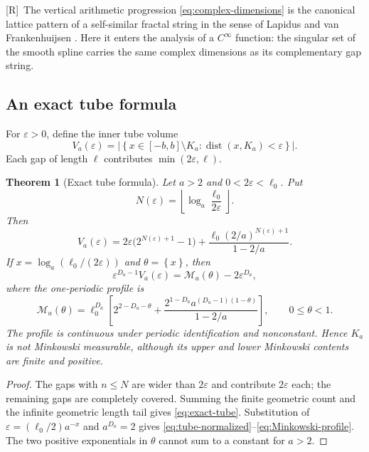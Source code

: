 \documentclass[11pt,oneside]{article}
\newtheorem{theorem}{Theorem}[section]
\theoremstyle{definition}
\theoremstyle{remark}
\newcommand{\dist}{\operatorname{dist}}
\newcommand{\eps}{\varepsilon}
\newcommand{\floor}[1]{\left\lfloor #1\right\rfloor}
\newcommand{\fract}[1]{\left\{#1\right\}}
\newcommand{\Rmark}{\textcolor{sourceblue}{\textsf{[R]}}}
\begin{document}
\Rmark\ The vertical arithmetic progression \eqref{eq:complex-dimensions} is the canonical
lattice pattern of a self-similar fractal string in the sense of Lapidus and van
Frankenhuijsen \cite{lapidus2003,lapidusbook}.  Here it enters the analysis of a $C^\infty$
function: the singular set of the smooth spline carries the same complex dimensions as its
complementary gap string.

\subsection{An exact tube formula}

For $\eps>0$, define the inner tube volume
\begin{equation}
 V_a(\eps)=
 \left|\left\{x\in[-b,b]\setminus K_a:\dist(x,K_a)<\eps\right\}\right|.
 \label{eq:tube-def}
\end{equation}
Each gap of length $\ell$ contributes $\min(2\eps,\ell)$.

\begin{theorem}[Exact tube formula]
\label{thm:tube-formula}
Let $a>2$ and $0<2\eps<\ell_0$.  Put
\begin{equation}
 N(\eps)=\floor{\log_a\frac{\ell_0}{2\eps}}.
 \label{eq:N-eps}
\end{equation}
Then
\begin{equation}
 \boxed{\quad
 V_a(\eps)=2\eps\bigl(2^{N(\eps)+1}-1\bigr)
 +\frac{\ell_0(2/a)^{N(\eps)+1}}{1-2/a}.
 \quad}
 \label{eq:exact-tube}
\end{equation}
If $x=\log_a(\ell_0/(2\eps))$ and $\theta=\fract{x}$, then
\begin{equation}
 \eps^{D_a-1}V_a(\eps)=\mathcal M_a(\theta)-2\eps^{D_a},
 \label{eq:tube-normalized}
\end{equation}
where the one-periodic profile is
\begin{equation}
 \mathcal M_a(\theta)=\ell_0^{D_a}
 \left[
 2^{2-D_a-\theta}
 +\frac{2^{1-D_a}a^{(D_a-1)(1-\theta)}}{1-2/a}
 \right],\qquad0\le\theta<1.
 \label{eq:Minkowski-profile}
\end{equation}
The profile is continuous under periodic identification and nonconstant.  Hence $K_a$ is not
Minkowski measurable, although its upper and lower Minkowski contents are finite and positive.
\end{theorem}

\begin{proof}
The gaps with $n\le N$ are wider than $2\eps$ and contribute $2\eps$ each; the remaining
gaps are completely covered.  Summing the finite geometric count and the infinite geometric
length tail gives \eqref{eq:exact-tube}.  Substitution of
$\eps=(\ell_0/2)a^{-x}$ and $a^{D_a}=2$ gives
\eqref{eq:tube-normalized}--\eqref{eq:Minkowski-profile}.  The two positive exponentials in
$\theta$ cannot sum to a constant for $a>2$.
\end{proof}
\end{document}
